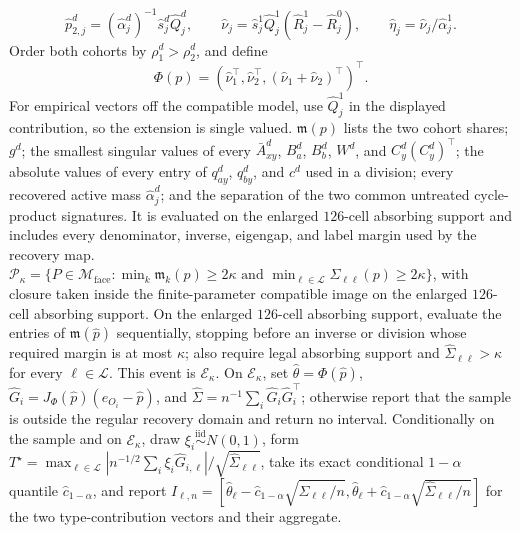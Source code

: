\[
 \widehat p_{2,j}^d=(\widehat\alpha_j^d)^{-1}\widehat s_j^d\widehat Q_j^d,
 \qquad
 \widehat\nu_j=\widehat s_j^1\widehat Q_j^1(\widehat R_j^1-\widehat R_j^0),
 \qquad
 \widehat\eta_j=\widehat\nu_j/\widehat\alpha_j^1.
\]
Order both cohorts by \(\rho_1^d>\rho_2^d\), and define
\[
 \Phi(p)=(\widehat\nu_1^\top,\widehat\nu_2^\top,
          (\widehat\nu_1+\widehat\nu_2)^\top)^\top.
\]
For empirical vectors off the compatible model, use \(\widehat Q_j^1\) in the displayed contribution, so the extension is single valued.
\(\mathfrak m(p)\) lists the two cohort shares; \(g^d\); the smallest singular values of every \(\bar A_{xy}^d\), \(B_a^d\), \(B_b^d\), \(W^d\), and \(C_y^d(C_y^d)^\top\); the absolute values of every entry of \(q_{ay}^d\), \(q_{by}^d\), and \(c^d\) used in a division; every recovered active mass \(\widehat\alpha_j^d\); and the separation of the two common untreated cycle-product signatures.  It is evaluated on the enlarged \(126\)-cell absorbing support and includes every denominator, inverse, eigengap, and label margin used by the recovery map.
\(\mathcal P_{\kappa}=\{P\in\mathcal M_{\mathrm{face}}:\min_k\mathfrak m_k(p)\geq2\kappa\text{ and }\min_{\ell\in\mathcal L}\Sigma_{\ell\ell}(p)\geq2\kappa\}\), with closure taken inside the finite-parameter compatible image on the enlarged \(126\)-cell absorbing support.
On the enlarged \(126\)-cell absorbing support, evaluate the entries of \(\mathfrak m(\widehat p)\) sequentially, stopping before an inverse or division whose required margin is at most \(\kappa\); also require legal absorbing support and \(\widehat\Sigma_{\ell\ell}>\kappa\) for every \(\ell\in\mathcal L\).  This event is \(\mathcal E_{\kappa}\).  On \(\mathcal E_{\kappa}\), set \(\widehat\theta=\Phi(\widehat p)\), \(\widehat G_i=J_{\Phi}(\widehat p)(e_{O_i}-\widehat p)\), and \(\widehat\Sigma=n^{-1}\sum_i\widehat G_i\widehat G_i^\top\); otherwise report that the sample is outside the regular recovery domain and return no interval.
Conditionally on the sample and on \(\mathcal E_{\kappa}\), draw \(\xi_i\stackrel{\mathrm{iid}}{\sim}N(0,1)\), form \(T^\star=\max_{\ell\in\mathcal L}|n^{-1/2}\sum_i\xi_i\widehat G_{i,\ell}|/\sqrt{\widehat\Sigma_{\ell\ell}}\), take its exact conditional \(1-\alpha\) quantile \(\widehat c_{1-\alpha}\), and report \(I_{\ell,n}=[\widehat\theta_\ell\mathbin{-}\widehat c_{1-\alpha}\sqrt{\widehat\Sigma_{\ell\ell}/n},\widehat\theta_\ell\mathbin{+}\widehat c_{1-\alpha}\sqrt{\widehat\Sigma_{\ell\ell}/n}]\) for the two type-contribution vectors and their aggregate.

